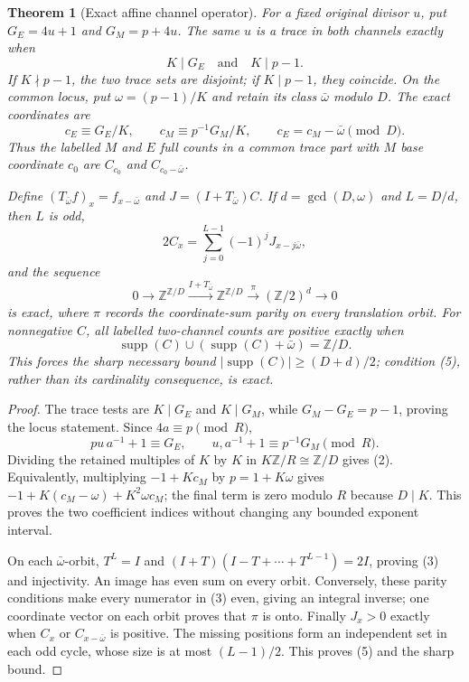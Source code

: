 \documentclass[10pt,reqno]{amsart}
\newtheorem{theorem}{Theorem}\newtheorem{proposition}[theorem]{Proposition}
\begin{document}
\begin{theorem}[Exact affine channel operator]\label{thm:short-affine}
For a fixed original divisor $u$, put $G_E=4u+1$ and $G_M=p+4u$.
The same $u$ is a trace in both channels exactly when
\[
 K\mid G_E\quad\text{and}\quad K\mid p-1.
\]
If $K\nmid p-1$, the two trace sets are disjoint; if $K\mid p-1$, they
coincide. On the common locus, put $\omega=(p-1)/K$ and retain its class
$\bar\omega$ modulo $D$. The exact coordinates are
\[
 c_E\equiv G_E/K,\qquad
 c_M\equiv p^{-1}G_M/K,\qquad
 c_E=c_M-\bar\omega\pmod D.                                  \tag{2}
\]
Thus the labelled $M$ and $E$ full counts in a common trace part with $M$
base coordinate $c_0$ are $C_{c_0}$ and $C_{c_0-\bar\omega}$.

Define $(T_{\bar\omega}f)_x=f_{x-\bar\omega}$ and
$J=(I+T_{\bar\omega})C$. If $d=\gcd(D,\omega)$ and $L=D/d$, then $L$ is odd,
\[
 2C_x=\sum_{j=0}^{L-1}(-1)^jJ_{x-j\bar\omega},                \tag{3}
\]
and the sequence
\[
0\longrightarrow\mathbb Z^{\mathbb Z/D}
\xrightarrow{I+T_{\bar\omega}}\mathbb Z^{\mathbb Z/D}
\xrightarrow{\pi}(\mathbb Z/2)^d\longrightarrow0              \tag{4}
\]
is exact, where $\pi$ records the coordinate-sum parity on every translation
orbit. For nonnegative $C$, all labelled two-channel counts are positive
exactly when
\[
 \operatorname{supp}(C)\cup
 (\operatorname{supp}(C)+\bar\omega)=\mathbb Z/D.              \tag{5}
\]
This forces the sharp necessary bound
$|\operatorname{supp}(C)|\ge(D+d)/2$; condition (5), rather than its
cardinality consequence, is exact.
\end{theorem}
\begin{proof}
The trace tests are $K\mid G_E$ and $K\mid G_M$, while
$G_M-G_E=p-1$, proving the locus statement. Since $4a\equiv p\pmod R$,
\[
 pu\,a^{-1}+1\equiv G_E,\qquad
 u,a^{-1}+1\equiv p^{-1}G_M\pmod R.
\]
Dividing the retained multiples of $K$ by $K$ in
$K\mathbb Z/R\cong\mathbb Z/D$ gives (2). Equivalently, multiplying
$-1+Kc_M$ by $p=1+K\omega$ gives
$-1+K(c_M-\omega)+K^2\omega c_M$; the final term is zero modulo $R$ because
$D\mid K$. This proves the two coefficient indices without changing any
bounded exponent interval.

On each $\bar\omega$-orbit, $T^L=I$ and
$(I+T)(I-T+\cdots+T^{L-1})=2I$, proving (3) and injectivity. An image has even
sum on every orbit. Conversely, these parity conditions make every numerator
in (3) even, giving an integral inverse; one coordinate vector on each orbit
proves that $\pi$ is onto. Finally $J_x>0$ exactly when $C_x$ or
$C_{x-\bar\omega}$ is positive. The missing positions form an independent
set in each odd cycle, whose size is at most $(L-1)/2$. This proves (5) and
the sharp bound.
\end{proof}
\end{document}
